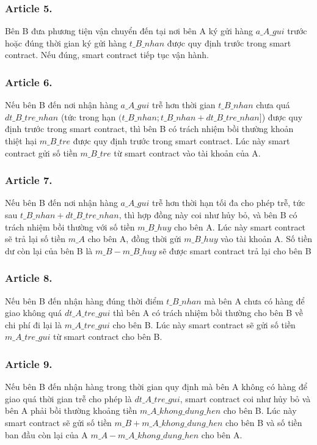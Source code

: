 \subsubsection*{Article 5.}
Bên B đưa phương tiện vận chuyển đến tại nơi bên A ký gửi hàng $ a\_A\_gui $ trước hoặc đúng thời gian ký gửi hàng $ t\_B\_nhan $ được quy định trước trong smart contract. Nếu đúng, smart contract tiếp tục vận hành.

\subsubsection*{Article 6.}
Nếu bên B đến nơi nhận hàng $ a\_A\_gui $ trễ hơn thời gian $ t\_B\_nhan $ chưa quá $ dt\_B\_tre\_nhan $ (tức trong hạn $ (t\_B\_nhan; t\_B\_nhan + dt\_B\_tre\_nhan] $) được quy định trước trong smart contract, thì bên B có trách nhiệm bồi thường khoản thiệt hại $ m\_B\_tre $ được quy định trước trong smart contract. Lúc này smart contract gửi số tiền $ m\_B\_tre $ từ smart contract vào tài khoản của A.

\subsubsection*{Article 7.}
Nếu bên B đến nơi nhận hàng $ a\_A\_gui $ trễ hơn thời hạn tối đa cho phép trễ, tức sau $ t\_B\_nhan + dt\_B\_tre\_nhan $, thì hợp đồng này coi như hủy bỏ, và bên B có trách nhiệm bồi thường với số tiền $ m\_B\_huy $ cho bên A. Lúc này smart contract sẽ trả lại số tiền $ m\_A $ cho bên A, đồng thời gửi $ m\_B\_huy $ vào tài khoản A. Số tiền dư còn lại của bên B là $ m\_B-m\_B\_huy $ sẽ được smart contract trả lại cho bên B 

\subsubsection*{Article 8.}
Nếu bên B đến nhận hàng đúng thời điểm $ t\_B\_nhan $ mà bên A chưa có hàng để giao không quá $ dt\_A\_tre\_gui $ thì bên A có trách nhiệm bồi thường cho bên B về chi phí đi lại là $ m\_A\_tre\_gui $ cho bên B. Lúc này smart contract sẽ gửi số tiền $ m\_A\_tre\_gui $ từ smart contract cho bên B.

\subsubsection*{Article 9.}
Nếu bên B đến nhận hàng trong thời gian quy định mà bên A không có hàng để giao quá thời gian trễ cho phép là $ dt\_A\_tre\_gui $, smart contract coi như hủy bỏ và bên A phải bồi thường khoảng tiền $ m\_A\_khong\_dung\_hen $ cho bên B. Lúc này smart contract sẽ gửi số tiền $ m\_B + m\_A\_khong\_dung\_hen $ cho bên B và số tiền ban đầu còn lại của A $ m\_A - m\_A\_khong\_dung\_hen $ cho bên A.

